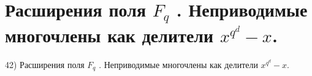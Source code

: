 \section{
 Расширения поля $F_q$ . Неприводимые многочлены как делители $x^{q^d} - x$.
}

42) Расширения поля $F_q$ . Неприводимые многочлены как делители $x^{q^d} - x$.
